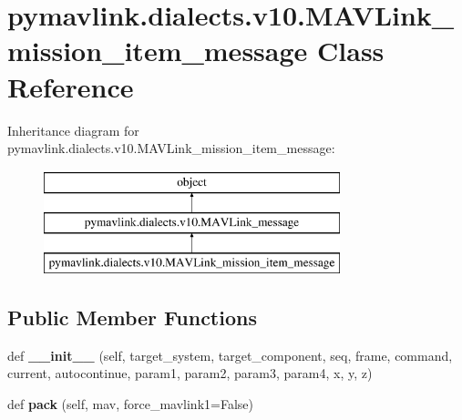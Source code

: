 \hypertarget{classpymavlink_1_1dialects_1_1v10_1_1MAVLink__mission__item__message}{}\section{pymavlink.\+dialects.\+v10.\+M\+A\+V\+Link\+\_\+mission\+\_\+item\+\_\+message Class Reference}
\label{classpymavlink_1_1dialects_1_1v10_1_1MAVLink__mission__item__message}
Inheritance diagram for pymavlink.\+dialects.\+v10.\+M\+A\+V\+Link\+\_\+mission\+\_\+item\+\_\+message\+:\begin{figure}[H]
\begin{center}
\leavevmode
\includegraphics[height=3.000000cm]{classpymavlink_1_1dialects_1_1v10_1_1MAVLink__mission__item__message}
\end{center}
\end{figure}
\subsection*{Public Member Functions}
\begin{DoxyCompactItemize}
\item 
\mbox{\label{classpymavlink_1_1dialects_1_1v10_1_1MAVLink__mission__item__message_a6194b8fb2b74a2a99f47e22827b83bd4}} 
def {\bfseries \+\_\+\+\_\+init\+\_\+\+\_\+} (self, target\+\_\+system, target\+\_\+component, seq, frame, command, current, autocontinue, param1, param2, param3, param4, x, y, z)
\item 
\mbox{\label{classpymavlink_1_1dialects_1_1v10_1_1MAVLink__mission__item__message_a6ea4e9bb4419ef700001a2b5fa16330f}} 
def {\bfseries pack} (self, mav, force\+\_\+mavlink1=False)
\end{DoxyCompactItemize}
